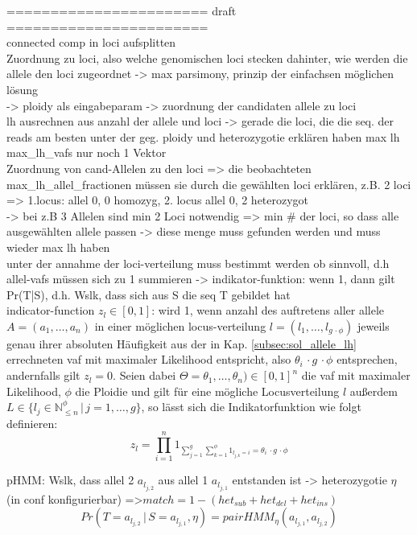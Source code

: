 \noindent======================= draft =======================\\



connected comp in loci aufsplitten\\
Zuordnung zu loci, also welche genomischen loci stecken dahinter, wie werden die allele den loci zugeordnet -> max parsimony, prinzip der einfachsen möglichen lösung \\
-> ploidy als eingabeparam -> zuordnung der candidaten allele zu loci\\
lh ausrechnen aus anzahl der allele und loci -> gerade die loci, die die seq. der reads am besten unter der geg. ploidy und heterozygotie erklären haben max lh
max\_lh\_vafs nur noch 1 Vektor\\
Zuordnung von cand-Allelen zu den loci => die beobachteten max\_lh\_allel\_fractionen müssen sie durch die gewählten loci erklären, z.B. 2 loci => 1.locus: allel 0, 0 homozyg, 2. locus allel 0, 2 heterozygot\\
-> bei z.B 3 Allelen sind min 2 Loci notwendig => min \# der loci, so dass alle ausgewählten allele passen -> diese menge muss gefunden werden und muss wieder max lh haben\\
unter der annahme der loci-verteilung muss bestimmt werden ob sinnvoll, d.h allel-vafs müssen sich zu 1 summieren -> indikator-funktion: wenn 1, dann gilt Pr(T|S), d.h. Wslk, dass sich aus S die seq T gebildet hat\\

indicator-function $z_{l} \in {[0,1]}$: wird 1, wenn anzahl des auftretens aller allele $A = (a_{1}, \dots, a_{n})$ in einer möglichen locus-verteilung $l = (l_{1}, \dots, l_{g \, \cdotp \phi})$ jeweils genau ihrer absoluten Häufigkeit aus der in Kap. \ref{subsec:sol_allele_lh} errechneten vaf mit maximaler Likelihood entspricht, also $\theta_{i} \, \cdotp g \, \cdotp \phi$ entsprechen, andernfalls gilt $ z_{l} = 0 $. Seien dabei  $\Theta=\theta_{1},\dots,\theta_{n}) \in [0,1]^n $ die vaf mit maximaler Likelihood, $ \phi $ die Ploidie und gilt für eine mögliche Locusverteilung $l$ außerdem $L \in \{l_{j} \in \mathds{N}_{\leq n}^\phi \, | \, j=1, \dots, g\}$, so lässt sich die Indikatorfunktion wie folgt definieren:
\begin{equation} \label{eqn:2-19}
\tag{2-19}
z_{l}=\prod_{i=1}^{n}1_{\sum_{j=1}^{g}\sum_{k=1}^{\phi}1_{l_{j,k}=i} = \theta_{i} \, \cdotp g \, \cdotp \phi}
\end{equation}

pHMM: Wslk, dass allel 2 $ a_{l_{j,2}} $ aus allel 1 $ a_{l_{j,1}} $ entstanden ist -> heterozygotie $\eta$ (in conf konfigurierbar) =>$ match = 1 - (het_{sub} + het_{del} + het_{ins}) $
\begin{equation} \label{eqn:2-20}
\tag{2-20}
Pr(T=a_{l_{j,2}} \, | \, S=a_{l_{j,1}}, \eta) = pairHMM_{\eta}(a_{l_{j,1}}, a_{l_{j,2}})
\end{equation}

